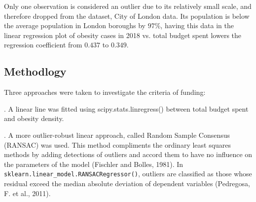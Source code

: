 \documentclass[12pt]{article}
\begin{document}
Only one observation is considered an outlier due to its relatively small scale, and therefore dropped from the dataset, City of London data. Its population is below the average population in London boroughs by $97\%$, having this data in the linear regression plot of obesity cases in 2018 vs. total budget spent lowers the regression coefficient from $0.437$ to $0.349$. 


\subsection{Methodlogy}
Three approaches were taken to investigate the criteria of funding:

. 
A linear line was fitted using scipy.stats.linregress() between total budget spent and obesity density. 


.
A more outlier-robust linear approach, called Random Sample Consensus (RANSAC) was used. This method compliments the ordinary least squares methods by adding detections of outliers and accord them to have no influence on the parameters of the model (Fischler and Bolles, 1981). In \verb|sklearn.linear_model.RANSACRegressor()|, outliers are classified as those whose residual exceed the median absolute deviation of dependent variables (Pedregosa, F. et al., 2011).
\end{document}
